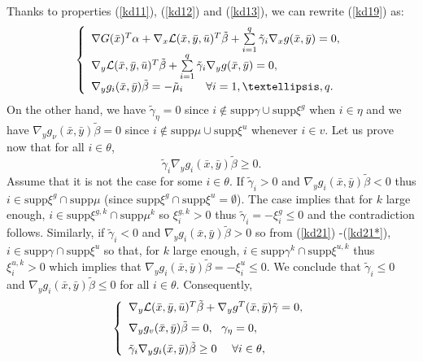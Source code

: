 	Thanks to properties (\ref{kd11}), (\ref{kd12}) and (\ref{kd13}), we can
	rewrite (\ref{kd19}) as:
	\begin{equation}
	\left\{
	\begin{array}
	[c]{l}
	\nabla G(\bar{x})^{T}\alpha+\nabla_{x}\mathcal{L}(\bar{x},\bar{y},\bar{u}
	)^{T}\tilde{\beta}+\sum\limits_{i=1}^{q}\tilde{\gamma}_{i}\nabla_{x}g(\bar{
		x},\bar{y})=0,\\[1ex]
	\nabla_{y}\mathcal{L}(\bar{x},\bar{y},\bar{u})^{T}\tilde{\beta} +\sum
	\limits_{i=1}^{q}\tilde{\gamma}_{i}\nabla_{y}g(\bar{x},\bar{y} )=0,\\[1ex]
	\nabla_{y}g_{i}(\bar{x},\bar{y})\tilde{\beta}=-\tilde{\mu}_{i}\text{
		\ \ \ \ \ }\forall i=1,\ldots,q.
	\end{array}
	\right. \label{kd21*}
	\end{equation}
	On the other hand, we have $\tilde{\gamma}_{\eta}=0$ since $i\notin
	\mathrm{supp}\gamma\cup\mathrm{supp}\xi^{g}$ when $i\in\eta$ and we have
	$\nabla_{y}g_{\nu}(\bar{x},\bar{y})\tilde{\beta}=0$ since $i\notin
	\mathrm{supp}\mu\cup\mathrm{supp}\xi^{u}$ whenever $i\in v$. Let us prove now
	that for all $i\in\theta$,
	\[
	\tilde{\gamma}_{i}\nabla_{y}g_{i}(\bar{x},\bar{y})\tilde{\beta}\geq0.
	\]
	Assume that it is not the case for some $i\in\theta.$ If $\tilde{\gamma}
	_{i}>0$ and $\nabla_{y}g_{i}(\bar{x},\bar{y})\tilde{\beta}<0$ thus
	$i\in\mathrm{supp}\xi^{g}\cap\mathrm{supp}\mu$ (since $\mathrm{supp}\xi
	^{g}\cap\mathrm{supp}\xi^{u}=\emptyset$)$.$ The case implies that for $k $
	large enough, $i\in\mathrm{supp}\xi^{g,k}\cap\mathrm{supp}\mu^{k}$ so $\xi
	_{i}^{g,k}>0$ thus $\tilde{\gamma}_{i}=-\xi_{i}^{g}\leq0$ and the
	contradiction follows. Similarly, if $\tilde{\gamma}_{i}<0$ and
	$\nabla_{y}g_{i}(\bar{x},\bar{y})\tilde{\beta}>0$ so from (\ref{kd21})
	-(\ref{kd21*}), $i\in\mathrm{supp}\gamma\cap\mathrm{supp}\xi^{u}$ so that, for
	$k$ large enough, $i\in\mathrm{supp}\gamma^{k}\cap\mathrm{supp}\xi^{u,k}$ thus
	$\xi_{i}^{u,k}>0$ which implies that $\nabla_{y}g_{i}(\bar{x},\bar{y}
	)\tilde{\beta}=-\xi_{i}^{u}\leq0.$ We conclude that $\tilde{\gamma}_{i}\leq0$
	and $\nabla_{y}g_{i}(\bar{x},\bar{y})\tilde{\beta}\leq0$ for all $i\in\theta.$
	Consequently, 
	\[
	\left\{
	\begin{array}
	[c]{l}
	\nabla_{y}\mathcal{L}(\bar{x},\bar{y},\bar{u})^{T}\tilde{\beta}+\nabla
	_{y}g^{T}(\bar{x},\bar{y})\tilde{\gamma}=0,\medskip\\
	\nabla_{y}g_{v}(\bar{x},\bar{y})\tilde{\beta}=0,\text{ \ }\gamma_{\eta
	}=0,\medskip\\
	\tilde{\gamma}_{i}\nabla_{y}g_{i}(\bar{x},\bar{y})\tilde{\beta}\geq0\text{
		\ \ \ }\forall i\in\theta,
	\end{array}
	\right.
	\]
